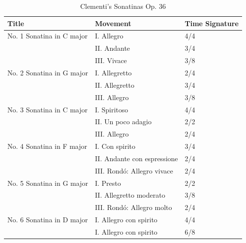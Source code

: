 \begin{table}
   \centering
   \caption{Clementi's Sonatinas Op. 36 }
   \label{tab:cleminfo}
   \begin{tabular}{lll}
      \hline
      \textbf{Title} & \textbf{Movement} & \textbf{Time Signature}\\
      \hline
      No. 1 Sonatina in C major&    I. Allegro &4/4\\
      &    II. Andante &3/4\\
      &    III. Vivace &3/8\\
      No. 2 Sonatina in G major&    I. Allegretto &2/4\\
      &    II. Allegretto &3/4\\
      &    III. Allegro &3/8\\
      No. 3 Sonatina in C major&    I. Spiritoso &4/4\\
      &    II. Un poco adagio &2/2\\
      &    III. Allegro &2/4\\
      No. 4 Sonatina in F major&    I. Con spirito &3/4\\
      &    II. Andante con espressione &2/4\\
      &    III. Rondó: Allegro vivace &2/4\\
      No. 5 Sonatina in G major&    I. Presto &2/2\\
      &    II. Allegretto moderato &3/8\\
      &    III. Rondó: Allegro molto &2/4\\
      No. 6 Sonatina in D major&    I. Allegro con spirito &4/4\\
      &    I. Allegro con spirito &6/8\\
      \hline
   \end{tabular}
\end{table}


